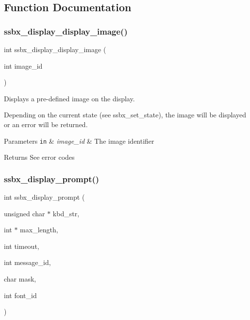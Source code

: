 \subsection{Function Documentation}
\hypertarget{group__ssbx___i_o_ga52d5005d7bb36355592b9ef2309281e2}{}\label{group__ssbx___i_o_ga52d5005d7bb36355592b9ef2309281e2} 
\subsubsection{\texorpdfstring{ssbx\+\_\+display\+\_\+display\+\_\+image()}{ssbx\_display\_display\_image()}}
{\footnotesize\ttfamily int ssbx\+\_\+display\+\_\+display\+\_\+image (\begin{DoxyParamCaption}\item[{int}]{image\+\_\+id }\end{DoxyParamCaption})}



Displays a pre-\/defined image on the display. 

Depending on the current state (see ssbx\+\_\+set\+\_\+state), the image will be displayed or an error will be returned.


\begin{DoxyParams}[1]{Parameters}
\mbox{\tt in}  & {\em image\+\_\+id} & The image identifier\\
\hline
\end{DoxyParams}
\begin{DoxyReturn}{Returns}
See error codes 
\end{DoxyReturn}
\hypertarget{group__ssbx___i_o_ga701c4c43823bad80a39745de2b5ad3af}{}\label{group__ssbx___i_o_ga701c4c43823bad80a39745de2b5ad3af} 
\subsubsection{\texorpdfstring{ssbx\+\_\+display\+\_\+prompt()}{ssbx\_display\_prompt()}}
{\footnotesize\ttfamily int ssbx\+\_\+display\+\_\+prompt (\begin{DoxyParamCaption}\item[{unsigned char $\ast$}]{kbd\+\_\+str,  }\item[{int $\ast$}]{max\+\_\+length,  }\item[{int}]{timeout,  }\item[{int}]{message\+\_\+id,  }\item[{char}]{mask,  }\item[{int}]{font\+\_\+id }\end{DoxyParamCaption})}



